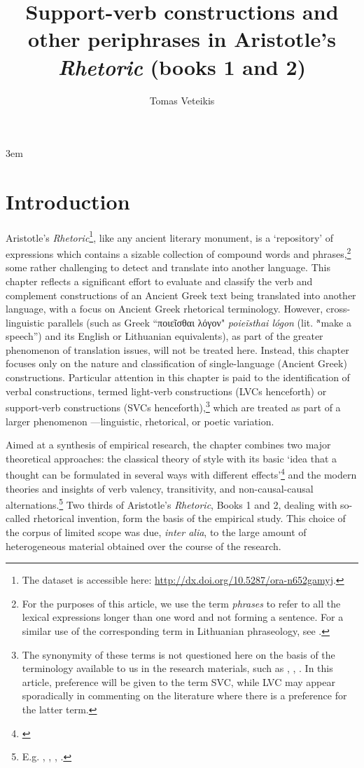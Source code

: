 \documentclass[output=paper,colorlinks,citecolor=brown]{langscibook}
\author{Tomas Veteikis\orcid{}\affiliation{Vilnius University}}
\title[Support-verb constructions and other periphrases in Aristotle’s \textit{Rhetoric}]{Support-verb constructions and other periphrases in Aristotle’s \textit{Rhetoric} (books 1 and 2)}
\begin{document}
\emergencystretch 3em

\maketitle


\section{Introduction}
Aristotle’s \textit{Rhetoric}\footnote{The dataset is accessible here: \url{http://dx.doi.org/10.5287/ora-n652gamyj}.}, like any ancient literary monument, is a `repository' of expressions which contains a sizable collection of compound words and phrases,\footnote{For the purposes of this article, we use the term \textit{phrases} to refer to all the lexical expressions longer than one word and not forming a sentence. For a similar use of the corresponding term in Lithuanian phraseology, see \citet[121--122]{Marcinkeviciene2010}.} some rather challenging to detect and translate into another language. This chapter reflects a significant effort to evaluate and classify the verb and complement constructions of an Ancient Greek text being translated into another language, with a focus on Ancient Greek rhetorical terminology.
However, cross-linguistic parallels (such as Greek “ποιεῖσθαι λόγον" \textit{poieĩsthai lógon} (lit. \~ “make a speech”) and its English or Lithuanian equivalents), as part of the greater phenomenon of translation issues, will not be treated here. Instead, this chapter focuses only on the nature and classification of single-language (Ancient Greek) constructions.
Particular attention in this chapter is paid to the identification of verbal constructions, termed light-verb constructions (LVCs henceforth) or support-verb constructions (SVCs henceforth),\footnote{The synonymity of these terms is not questioned here on the basis of the terminology available to us in the research materials, such as \citet{Langer2004}, \citet{Kovalevskaite-etal2020}, \citet{Fotopoulou-etal2021}. In this article, preference will be given to the term SVC, while LVC may appear sporadically in commenting on the literature where there is a preference for the latter term.} which are treated as part of a larger phenomenon —linguistic, rhetorical, or poetic variation.

Aimed at a synthesis of empirical research, the chapter combines two major theoretical approaches: the classical theory of style with its basic ‘idea that a thought can be formulated in several ways with different effects'\footnote{\citet[326]{deJonge2014}} and the modern theories and insights of verb valency, transitivity, and non-causal-causal alternations.\footnote{E.g. \citet{Lavidas2009}, \citet{Arkadiev-Pakerys2015}, \citet{Haspelmath2016}, \citet{Grossman-WitzlackMakarevich2019}.} Two thirds of Aristotle’s \textit{Rhetoric}, Books 1 and 2, dealing with so-called rhetorical invention, form the basis of the empirical study. This choice of the corpus of limited scope was due, \textit{inter alia}, to the large amount of heterogeneous material obtained over the course of the research. 
\end{document}
